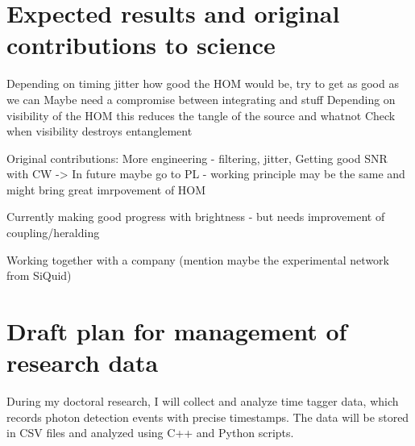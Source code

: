 \documentclass{article}
\theoremstyle{mytheoremstyle}
\theoremstyle{mytheoremstyle}
\theoremstyle{myproblemstyle}
\begin{document}


\section{Expected results and original contributions to science}
Depending on timing jitter how good the HOM would be, try to get as good as we can
Maybe need a compromise between integrating and stuff
Depending on visibility of the HOM this reduces the tangle of the source and whatnot
Check when visibility destroys entanglement

Original contributions: More engineering - filtering, jitter,
Getting good SNR with CW -> In future maybe go to PL - working principle may be the same and might bring great imrpovement of HOM

Currently making good progress with brightness - but needs improvement of coupling/heralding

Working together with a company (mention maybe the experimental network from SiQuid)

\section{Draft plan for management of research data}
During my doctoral research, I will collect and analyze time tagger data,
which records photon detection events with precise timestamps.
The data will be stored in CSV files and analyzed using C++ and Python scripts.
\end{document}
